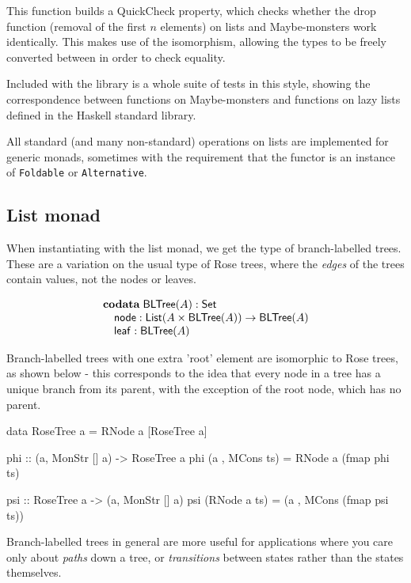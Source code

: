 \documentclass{article}
\begin{document}
This function builds a QuickCheck property, which checks whether the drop function (removal of the first $n$ elements) on lists and Maybe-monsters work identically. This makes use of the isomorphism, allowing the types to be freely converted between in order to check equality. 

Included with the library is a whole suite of tests in this style, showing the correspondence between functions on Maybe-monsters and functions on lazy lists defined in the Haskell standard library.

All standard (and many non-standard) operations on lists are implemented for generic monads, sometimes with the requirement that the functor is an instance of \verb+Foldable+ or \verb+Alternative+.

\subsection{List monad}

When instantiating with the list monad, we get the type of branch-labelled trees. These are a variation on the usual type of Rose trees, where the \emph{edges} of the trees contain values, not the nodes or leaves.

$$
\begin{array}[t]{l}
\mathbf{codata}\;
\mathsf{BLTree}(A):\mathsf{Set}\\
\quad \mathsf{node} : \mathsf{List}(A \times \mathsf{BLTree}(A)) \rightarrow \mathsf{BLTree}(A)\\
\quad \mathsf{leaf} : \mathsf{BLTree}(A)
\end{array}
$$

Branch-labelled trees with one extra 'root' element are isomorphic to Rose trees, as shown below - this corresponds to the idea that every node in a tree has a unique branch from its parent, with the exception of the root node, which has no parent.

\begin{haskell}
data RoseTree a = RNode a [RoseTree a]

phi :: (a, MonStr [] a) -> RoseTree a
phi (a , MCons ts) = RNode a (fmap phi ts)

psi :: RoseTree a -> (a, MonStr [] a)
psi (RNode a ts) = (a , MCons (fmap psi ts))
\end{haskell}

Branch-labelled trees in general are more useful for applications where you care only about \emph{paths} down a tree, or \emph{transitions} between states rather than the states themselves. 
\end{document}
